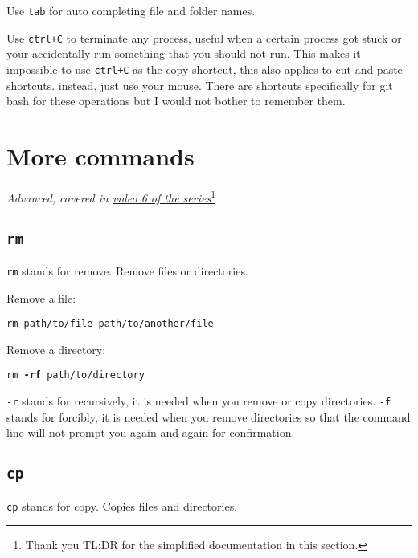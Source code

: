 Use \texttt{tab} for auto completing file and folder names.
\vspace{6mm}

Use \texttt{ctrl+C} to terminate any process, useful when a certain process got stuck or your accidentally run something that you should not run. 
This makes it impossible to use \texttt{ctrl+C} as the copy shortcut, this also applies to cut and paste shortcuts. instead, just use your mouse. There are shortcuts specifically for git bash for these operations but I would not bother to remember them.
\vspace{6mm}

\section{More commands}

\textit{Advanced, }
\textit{covered in \href{https://www.youtube.com/watch?v=U0bDr7b2cOM&list=PLjGmdnqrOKuYXiu7lgG5HW71jPEUd1XCm&index=8}{video 6 of the series}}\footnote{Thank you TL;DR for the simplified documentation in this section.}
\vspace{6mm}

\subsection{\texttt{rm}}

\texttt{rm} stands for remove. Remove files or directories.
\vspace{6mm}

Remove a file: 

\texttt{rm path/to/file path/to/another/file}
\vspace{6mm}

Remove a directory:

\texttt{rm \textbf{-rf} path/to/directory}
\vspace{6mm}

\texttt{-r} stands for recursively, it is needed when you remove or copy directories. \texttt{-f} stands for forcibly, it is needed when you remove directories so that the command line will not prompt you again and again for confirmation.

\subsection{\texttt{cp}}

\texttt{cp} stands for copy. Copies files and directories.
\vspace{6mm}

